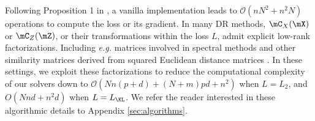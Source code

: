 Following Proposition 1 in \citep{peyre2016gromov}, a vanilla implementation leads to $\mathcal{O}(n N^2 + n^2N)$ operations to compute the loss or its gradient. In many DR methods, $\mC_X(\mX)$ or $\mC_Z(\mZ)$, or their transformations within the loss $L$, admit explicit low-rank factorizations. Including \emph{e.g.} matrices involved in spectral methods and other similarity matrices derived from squared Euclidean distance matrices \citep{scetbon2022linear}. In these settings, we exploit these factorizations to reduce the computational complexity of our solvers down to $\mathcal{O}(Nn(p + d) + (N + m)pd + n^2)$ when $L=L_2$, and $O(Nnd + n^2d)$ when $L = L_{\KL}$. We refer the reader interested in these algorithmic details to Appendix \ref{sec:algorithms}.


